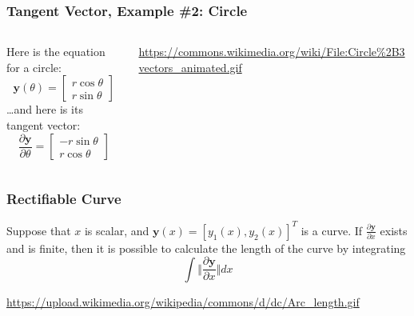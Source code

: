 \documentclass{beamer}
\begin{document}
\begin{frame}
  \frametitle{Tangent Vector, Example \#2: Circle}
  \begin{columns}
    \begin{column}{0.5\textwidth}
      Here is the equation for a circle:
      \begin{displaymath}
        \mathbf{y}(\theta)=\left[\begin{array}{c}
          r\cos\theta\\r\sin\theta\end{array}\right]
      \end{displaymath}
      \ldots and here is its tangent vector:
      \begin{displaymath}
        \frac{\partial\mathbf{y}}{\partial\theta}=
        \left[\begin{array}{c}
            -r\sin\theta\\r\cos\theta
          \end{array}\right]
      \end{displaymath}
    \end{column}
    \begin{column}{0.5\textwidth}
      \centerline{}
      \url{https://commons.wikimedia.org/wiki/File:Circle\%2B3vectors_animated.gif}
    \end{column}
  \end{columns}
\end{frame}

\begin{frame}
  \frametitle{Rectifiable Curve}

  Suppose that $x$ is scalar, and $\mathbf{y}(x)=[y_1(x),y_2(x)]^T$ is
  a curve.  If $\frac{\partial\mathbf{y}}{\partial x}$ exists and is
  finite, then it is possible to calculate the length of the curve by
  integrating
  \begin{displaymath}
    \int \Vert\frac{\partial\mathbf{y}}{\partial x}\Vert dx
  \end{displaymath}
  \centerline{}
  \url{https://upload.wikimedia.org/wikipedia/commons/d/dc/Arc_length.gif}
\end{frame}
\end{document}
